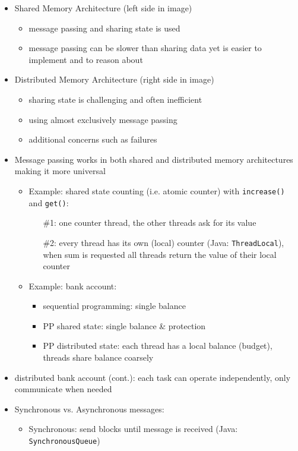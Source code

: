 \documentclass[a4paper]{article}
\newcommand{\inline}[1]{\lstinline!#1!}%
\begin{document}
\begin{itemize}
\item Shared Memory Architecture (left side in image)
\begin{itemize}
\item message passing and sharing state is used
\item message passing can be slower than sharing data yet is easier to implement and to reason about 
\end{itemize}
\item Distributed Memory Architecture (right side in image)
\begin{itemize}
\item sharing state is challenging and often inefficient
\item using almost exclusively message passing
\item additional concerns such as failures
\end{itemize}
\item Message passing works in both shared and distributed memory architectures making it more universal
\begin{itemize}
\item Example: shared state counting (i.e. atomic counter) with \inline{increase()} and \inline{get()}: 
\begin{enumerate}
\item[\#1:] one counter thread, the other threads ask for its value
\item[\#2:] every thread has its own (local) counter (Java: \inline{ThreadLocal}), when sum is requested all threads return the value of their local counter
\end{enumerate}
\item Example: bank account: 
\begin{itemize}
\item sequential programming: single balance
\item PP shared state: single balance \& protection
\item PP distributed state: each thread has a local balance (budget), threads share balance coarsely 
\end{itemize}
\end{itemize}
\item distributed bank account (cont.): each task can operate independently, only communicate when needed
\item Synchronous vs. Asynchronous messages: 
\begin{itemize}
\item Synchronous: send blocks until message is received (Java: \inline{SynchronousQueue})

\end{itemize}
\end{itemize}
\end{document}
